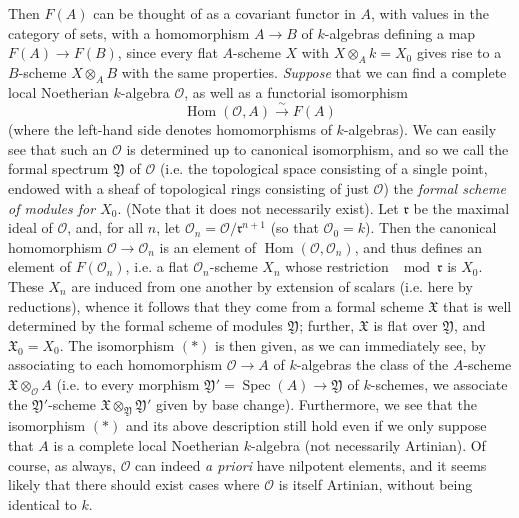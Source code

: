   Then \(F(A)\) can be thought of as a covariant functor in \(A\), with values in the category of sets, with a homomorphism \(A\to  B\) of \(k\)-algebras defining a map \(F(A)\to  F(B)\), since every flat \(A\)-scheme \(X\) with \(X\otimes _Ak=X_0\) gives rise to a \(B\)-scheme \(X\otimes _AB\) with the same properties.
  \emph{Suppose} that we can find a complete local Noetherian \(k\)-algebra \(\mathcal {O}\), as well as a functorial isomorphism
  \[     \operatorname {Hom}(\mathcal {O},A) \xrightarrow {\sim } F(A)     \tag{*}   \]
  (where the left-hand side denotes homomorphisms of \(k\)-algebras).
  We can easily see that such an \(\mathcal {O}\) is determined up to canonical isomorphism, and so we call the formal spectrum \(\mathfrak {Y}\) of \(\mathcal {O}\) (i.e. the topological space consisting of a single point, endowed with a sheaf of topological rings consisting of just \(\mathcal {O}\)) the \emph{formal scheme of modules for \(X_0\)}.
  (Note that it does not necessarily exist).
  Let \(\mathfrak {r}\) be the maximal ideal of \(\mathcal {O}\), and, for all \(n\), let \(\mathcal {O}_n=\mathcal {O} /\mathfrak {r}^{n+1}\) (so that \(\mathcal {O}_0=k\)).
  Then the canonical homomorphism \(\mathcal {O}\to \mathcal {O}_n\) is an element of \(\operatorname {Hom}(\mathcal {O},\mathcal {O}_n)\), and thus defines an element of \(F(\mathcal {O}_n)\), i.e. a flat \(\mathcal {O}_n\)-scheme \(X_n\) whose restriction \(\mod \mathfrak {r}\) is \(X_0\).
  These \(X_n\) are induced from one another by extension of scalars (i.e. here by reductions), whence it follows that they come from a formal scheme \(\mathfrak {X}\) that is well determined by the formal scheme of modules \(\mathfrak {Y}\);
  further, \(\mathfrak {X}\) is flat over \(\mathfrak {Y}\), and \(\mathfrak {X}_0=X_0\).
  The isomorphism \((*)\) is then given, as we can immediately see, by associating to each homomorphism \(\mathcal {O}\to  A\) of \(k\)-algebras the class of the \(A\)-scheme \(\mathfrak {X}\otimes _{\mathcal {O}} A\) (i.e. to every morphism \(\mathfrak {Y}'=\operatorname {Spec}(A)\to \mathfrak {Y}\) of \(k\)-schemes, we associate the \(\mathfrak {Y}'\)-scheme \(\mathfrak {X}\otimes _{\mathfrak {Y}}\mathfrak {Y}'\) given by base change).
  Furthermore, we see that the isomorphism \((*)\) and its above description still hold even if we only suppose that \(A\) is a complete local Noetherian \(k\)-algebra (not necessarily Artinian).
  Of course, as always, \(\mathcal {O}\) can indeed \emph{a priori} have nilpotent elements, and it seems likely that there should exist cases where \(\mathcal {O}\) is itself Artinian, without being identical to \(k\).
